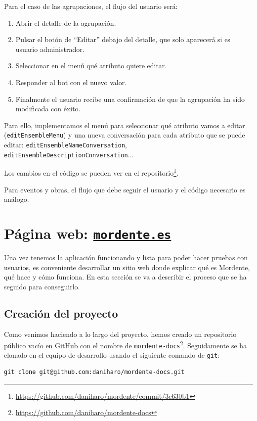 Para el caso de las agrupaciones, el flujo del usuario será:
\begin{enumerate}
    \item Abrir el detalle de la agrupación.
    \item Pulsar el botón de ``Editar'' debajo del detalle, que solo aparecerá si es usuario administrador.
    \item Seleccionar en el menú qué atributo quiere editar.
    \item Responder al bot con el nuevo valor.
    \item Finalmente el usuario recibe una confirmación de que la agrupación ha sido modificada con éxito.
\end{enumerate}

\sloppy
Para ello, implementamos el menú para seleccionar qué atributo vamos a editar (\texttt{editEnsembleMenu}) y una nueva conversación para cada atributo que se puede editar: \texttt{editEnsembleNameConversation}, \texttt{editEnsembleDescriptionConversation}...

Los cambios en el código se pueden ver en el repositorio\footnote{\url{https://github.com/daniharo/mordente/commit/3e630b1}}.

Para eventos y obras, el flujo que debe seguir el usuario y el código necesario es análogo.


\section{Página web: \href{https://mordente.es}{\texttt{mordente.es}}}

Una vez tenemos la aplicación funcionando y lista para poder hacer pruebas con usuarios, es conveniente desarrollar un sitio web donde explicar qué es Mordente, qué hace y cómo funciona. En esta sección se va a describir el proceso que se ha seguido para conseguirlo.

\subsection{Creación del proyecto}

Como venimos haciendo a lo largo del proyecto, hemos creado un repositorio público vacío en GitHub con el nombre de \texttt{mordente-docs}\footnote{\url{https://github.com/daniharo/mordente-docs}}. Seguidamente se ha clonado en el equipo de desarrollo usando el siguiente comando de \texttt{git}:

\begin{verbatim}
git clone git@github.com:daniharo/mordente-docs.git
\end{verbatim}


